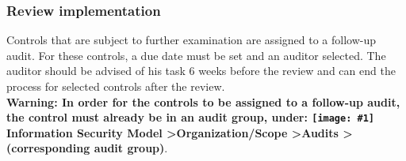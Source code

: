 \documentclass[a4paper,10pt]{book}
\newcommand{\icon}[1]{\texttt{[image: \#1]}}
\begin{document}
\subsubsection{Review implementation}
Controls that are subject to further examination are assigned to a follow-up audit. For these controls, a due date must be set and an auditor selected. The auditor should be advised of his task 6 weeks before the review and can end the process for selected controls after the review.
\newline\\
\textbf{Warning: In order for the controls to be assigned to a follow-up audit, the control must already be in an audit group,
under: \textbf {\icon{Icon/Informationssicherheitsmodell.png} Information Security Model \textgreater Organization/Scope \textgreater Audits
\textgreater (corresponding audit group)}}.
\end{document}
